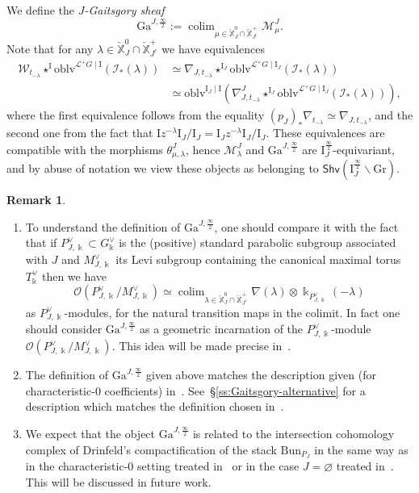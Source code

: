 \documentclass[11pt]{amsart}
\numberwithin{equation}{section}
\theoremstyle{plain}
\theoremstyle{definition}
\newtheorem{rmk}[thm]{Remark}
\newcommand{\I}{{\mathrm I}}
\newcommand{\sI}{{\mathcal I}}
\renewcommand{\k}{\Bbbk}
\newcommand{\sL}{{\mathcal L}}
\newcommand{\sM}{{\mathcal M}}
\newcommand{\sW}{{\mathcal W}}
\newcommand{\X}{{\mathbb X}}
\newcommand{\Xd}{\check{\X}}
\newcommand{\semi}{{{\frac{\infty}{2}}}}
\newcommand{\oblv}{\mathrm{oblv}}
\newcommand{\Shv}{\mathsf{Shv}}
\newcommand{\Gr}{\mathrm{Gr}}
\newcommand{\comp}{\mathrm{c}}
\newcommand{\Gait}{\mathrm{Ga}}
\DeclareMathOperator*{\colim}{colim}
\begin{document}
We define the \textit{$J$-Gaitsgory sheaf}
\[
\Gait^{J,\semi}:= \colim_{\mu\in \Xd^0_J\cap \Xd^+_{J^\comp}} \sM^J_\mu. 
\]
Note that for any $\lambda\in \Xd^0_J\cap \Xd^+_{J^\comp}$ we have equivalences 
\begin{equation}
\label{equ:Mlambda-Jsemi}
\begin{aligned}
\sW_{t_{-\lambda}} \star^\I \oblv^{\sL^+G\mid \I}(\sI_*(\lambda))
&\simeq \nabla_{J,t_{-\lambda}} \star^{\I_J} \oblv^{\sL^+G\mid \I_J}(\sI_*(\lambda)) \\ 
&\simeq \oblv^{\I_J \mid \I}( \nabla^J_{J,t_{-\lambda}} \star^{\I_J} \oblv^{\sL^+G\mid \I_J}(\sI_*(\lambda))),
\end{aligned}
\end{equation}
where the first equivalence follows from the equality $(p_J)_* \nabla_{t_{-\lambda}} \simeq \nabla_{J,t_{-\lambda}}$, and the second one from the fact that $\I z^{-\lambda}\I_J/\I_J=\I_J z^{-\lambda}\I_J/\I_J$. 
These equivalences are compatible with the morphisms $\theta_{\mu,\lambda}^J$,
hence $\sM^J_\lambda$ and $\Gait^{J,\semi}$ are $\I^\semi_J$-equivariant, and by abuse of notation we view 
these objects as belonging to $\Shv\left( \I^\semi_J \backslash \Gr \right)$.

\begin{rmk}
\label{rmk:Gait-functions-P/L}
\begin{enumerate}
\item
\label{it:OP/L-colim}
To understand the definition of $\Gait^{J,\semi}$, one should compare it with the fact that if $P^\vee_{J,\k} \subset G^\vee_\k$ is the (positive) standard parabolic subgroup associated with $J$ and $M^\vee_{J,\k}$ its Levi subgroup containing the canonical maximal torus $T^\vee_\k$ then we have
\[
\mathscr{O}(P^\vee_{J,\k} / M^\vee_{J,\k}) \simeq \colim_{\lambda \in \Xd^0_J\cap \Xd^+_{J^\comp}} \nabla(\lambda) \otimes \k_{P^\vee_{J,\k}}(-\lambda)
\]
as $P^\vee_{J,\k}$-modules, for the natural transition maps in the colimit. In fact one should consider $\Gait^{J,\semi}$ as a geometric incarnation of the $P^\vee_{J,\k}$-module $\mathscr{O}(P^\vee_{J,\k} / M^\vee_{J,\k})$. This idea will be made precise in~\cite{adrs}.
\item
The definition of $\Gait^{J,\semi}$ given above matches the description given (for cha\-racteristic-$0$ coefficients) in~\cite[\S 4.1.9]{DL23}. See~\S\ref{ss:Gaitsgory-alternative} for a description which matches the definition chosen in~\cite{DL23}.
\item
We expect that the object $\Gait^{J,\semi}$ is related to the intersection cohomology complex of Drinfeld's compactification of the stack $\mathrm{Bun}_{P_J}$ in the same way as in the characteristic-$0$ setting treated in~\cite[\S 4.2]{DL23} or in the case $J=\varnothing$ treated in~\cite{adr-Drinfeld}. This will be discussed in future work.
\end{enumerate} 
\end{rmk}
\end{document}
